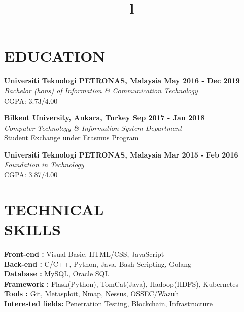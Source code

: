 \documentclass[margin]{res}
\begin{document}
\begin{resume}
\section{EDUCATION}
\textbf{Universiti Teknologi PETRONAS, Malaysia
\hfill{May 2016 - Dec 2019}} \\
{\sl Bachelor (hons) of Information \& Communication Technology} \\
\hfill CGPA: 3.73/4.00

\textbf{Bilkent University, Ankara, Turkey
\hfill{Sep 2017 - Jan 2018}} \\
{\sl Computer Technology \& Information System Department} \\
\hfill Student Exchange under Erasmus Program

\textbf{Universiti Teknologi PETRONAS, Malaysia 
\hfill{Mar 2015 - Feb 2016}} \\
{\sl Foundation in Technology} \\
\hfill CGPA: 3.87/4.00

\section{TECHNICAL\\SKILLS}
\textbf{Front-end : } \quad Visual Basic, HTML/CSS, JavaScript
\\
\textbf{Back-end : } \quad C/C++, Python, Java, Bash Scripting, Golang
\\
\textbf{Database :} \quad \quad MySQL, Oracle SQL
\\
\textbf{Framework : } Flask(Python), TomCat(Java), Hadoop(HDFS), Kubernetes
\\
\textbf{Tools : }  \quad \quad \quad Git, Metasploit, Nmap, Nessus, OSSEC/Wazuh
\\
\textbf{Interested fields: } Penetration Testing, Blockchain, Infrastructure
\begin{format}
\title{l}\\
\\
\body\\
\end{format}

\end{resume}
\end{document}
